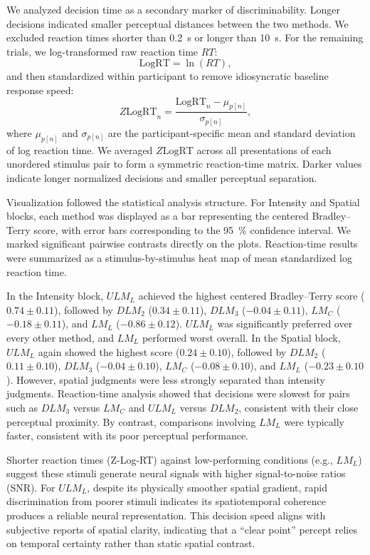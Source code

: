 \documentclass[pdflatex, sn-nature]{sn-jnl}
\theoremstyle{thmstyleone}%
\theoremstyle{thmstyletwo}%
\theoremstyle{thmstylethree}%
\begin{document}
We analyzed decision time as a secondary marker of discriminability. Longer decisions indicated smaller perceptual distances between the two methods. We excluded reaction times shorter than \qty{0.2}{\second} or longer than \qty{10}{\second}. For the remaining trials, we log-transformed raw reaction time $RT$:
\begin{equation}
    \mathrm{LogRT}=\ln(RT),
\end{equation}
and then standardized within participant to remove idiosyncratic baseline response speed:
\begin{equation}
    Z\mathrm{LogRT}_{n}=\frac{\mathrm{LogRT}_{n}-\mu_{p[n]}}{\sigma_{p[n]}} ,
\end{equation}
where $\mu_{p[n]}$ and $\sigma_{p[n]}$ are the participant-specific mean and standard deviation of log reaction time. We averaged $Z\mathrm{LogRT}$ across all presentations of each unordered stimulus pair to form a symmetric reaction-time matrix. Darker values indicate longer normalized decisions and smaller perceptual separation.

Visualization followed the statistical analysis structure. For Intensity and Spatial blocks, each method was displayed as a bar representing the centered Bradley--Terry score, with error bars corresponding to the \qty{95}{\percent} confidence interval. We marked significant pairwise contrasts directly on the plots. Reaction-time results were summarized as a stimulus-by-stimulus heat map of mean standardized log reaction time.

In the Intensity block, $ULM_L$ achieved the highest centered Bradley--Terry score ($0.74\pm0.11$), followed by $DLM_2$ ($0.34\pm0.11$), $DLM_3$ ($-0.04\pm0.11$), $LM_C$ ($-0.18\pm0.11$), and $LM_L$ ($-0.86\pm0.12$). $ULM_L$ was significantly preferred over every other method, and $LM_L$ performed worst overall. In the Spatial block, $ULM_L$ again showed the highest score ($0.24\pm0.10$), followed by $DLM_2$ ($0.11\pm0.10$), $DLM_3$ ($-0.04\pm0.10$), $LM_C$ ($-0.08\pm0.10$), and $LM_L$ ($-0.23\pm0.10$). However, spatial judgments were less strongly separated than intensity judgments. Reaction-time analysis showed that decisions were slowest for pairs such as $DLM_3$ versus $LM_C$ and $ULM_L$ versus $DLM_2$, consistent with their close perceptual proximity. By contrast, comparisons involving $LM_L$ were typically faster, consistent with its poor perceptual performance.

Shorter reaction times (Z-Log-RT) against low-performing conditions (e.g., $LM_L$) suggest these stimuli generate neural signals with higher signal-to-noise ratios (SNR). For $ULM_L$, despite its physically smoother spatial gradient, rapid discrimination from poorer stimuli indicates its spatiotemporal coherence produces a reliable neural representation. This decision speed aligns with subjective reports of spatial clarity, indicating that a ``clear point'' percept relies on temporal certainty rather than static spatial contrast.
\end{document}

